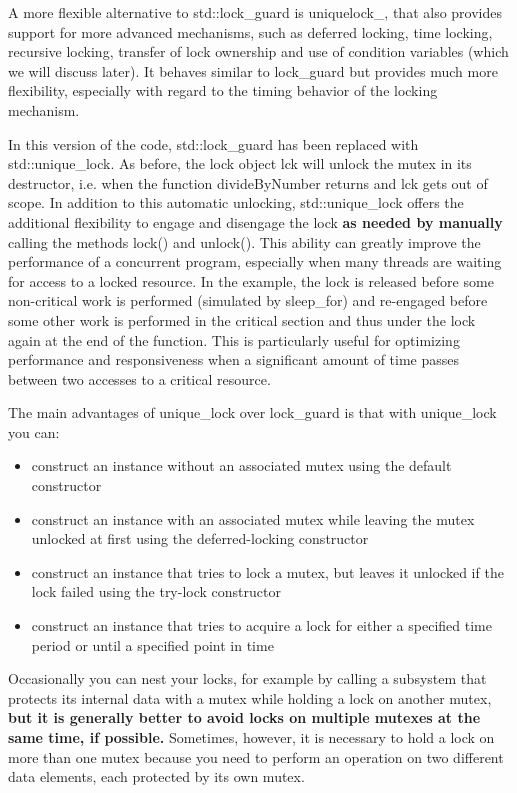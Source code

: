 \documentclass[11pt, a4paper]{article}
\begin{document}
A more flexible alternative to std::lock\_guard is uniquelock\_, that also provides support for more advanced mechanisms, such as deferred locking, time locking, recursive locking, transfer of lock ownership and use of condition variables (which we will discuss later). It behaves similar to lock\_guard but provides much more flexibility, especially with regard to the timing behavior of the locking mechanism.




In this version of the code, std::lock\_guard has been replaced with std::unique\_lock. As before, the lock object lck will unlock the mutex in its destructor, i.e. when the function divideByNumber returns and lck gets out of scope. In addition to this automatic unlocking, std::unique\_lock offers the additional flexibility to engage and disengage the lock \textbf{as needed by manually} calling the methods lock() and unlock(). This ability can greatly improve the performance of a concurrent program, especially when many threads are waiting for access to a locked resource. In the example, the lock is released before some non-critical work is performed (simulated by sleep\_for) and re-engaged before some other work is performed in the critical section and thus under the lock again at the end of the function. This is particularly useful for optimizing performance and responsiveness when a significant amount of time passes between two accesses to a critical resource.



The main advantages of unique\_lock over lock\_guard is that with unique\_lock you can:

\begin{itemize}
	\item construct an instance without an associated mutex using the default constructor
	\item construct an instance with an associated mutex while leaving the mutex unlocked at first using the deferred-locking constructor
	\item construct an instance that tries to lock a mutex, but leaves it unlocked if the lock failed using the try-lock constructor
	\item construct an instance that tries to acquire a lock for either a specified time period or until a specified point in time
\end{itemize}




Occasionally you can nest your locks, for example by calling a subsystem that protects its internal data with a mutex while holding a lock on another mutex, \textbf{but it is generally better to avoid locks on multiple mutexes at the same time, if possible.}
Sometimes, however, it is necessary to hold a lock on more than one mutex because you need to perform an operation on two different data elements, each protected by its own mutex.
\end{document}

